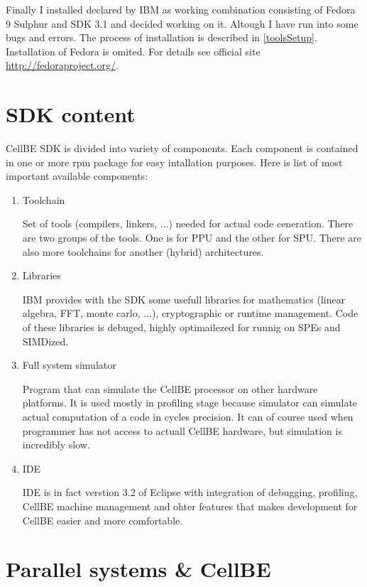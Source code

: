 \par
Finally I installed declared by IBM as working combination consisting of Fedora 9 Sulphur and SDK 3.1 and decided working on it. Altough I have run into some bugs and errors. The process of installation is described in \ref{toolsSetup}. Installation of Fedora is omited. For details see official site \url{http://fedoraproject.org/}.


\section {SDK content}

CellBE SDK is divided into variety of components. Each component is contained in one or more rpm package for easy intallation purposes. Here is list of most important available components:
\begin{enumerate}
  \item {Toolchain}
  \par
  Set of tools (compilers, linkers, ...) needed for actual code ceneration. There are two groups of the tools. One is for PPU and the other for SPU. There are also more toolchains for another (hybrid) architectures.

  \item {Libraries}
  \par
  IBM provides with the SDK some usefull libraries for mathematics (linear algebra, FFT, monte carlo, ...), cryptographic or runtime management. Code of these libraries is debuged, highly optimailezed for runnig on SPEs and SIMDized.

  \item {Full system simulator}
  \par
  Program that can simulate the CellBE processor on other hardware platforms. It is used mostly in profiling stage because simulator can simulate actual computation of a code in cycles precision. It can of course used when programmer has not access to actuall CellBE hardware, but simulation is incredibly slow.

  \item {IDE}
  \par
  IDE is in fact verstion 3.2 of Eclipse with integration of debugging, profiling, CellBE machine management and ohter features that makes development for CellBE easier and more comfortable.
\end{enumerate}


\section{Parallel systems \& CellBE}

